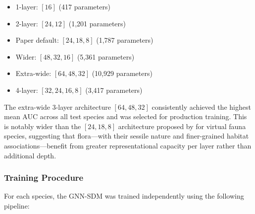 \begin{itemize}
    \item 1-layer: $[16]$ (417 parameters)
    \item 2-layer: $[24, 12]$ (1,201 parameters)
    \item Paper default: $[24, 18, 8]$ (1,787 parameters)
    \item Wider: $[48, 32, 16]$ (5,361 parameters)
    \item Extra-wide: $[64, 48, 32]$ (10,929 parameters)
    \item 4-layer: $[32, 24, 16, 8]$ (3,417 parameters)
\end{itemize}

The extra-wide 3-layer architecture $[64, 48, 32]$ consistently achieved the 
highest mean AUC across all test species and was selected for production training. 
This is notably wider than the $[24, 18, 8]$ architecture proposed by \citet{Wu2025} 
for virtual fauna species, suggesting that flora---with their sessile nature and 
finer-grained habitat associations---benefit from greater representational 
capacity per layer rather than additional depth.

\subsubsection{Training Procedure}
\label{sec:training}

For each species, the GNN-SDM was trained independently using the following pipeline:

